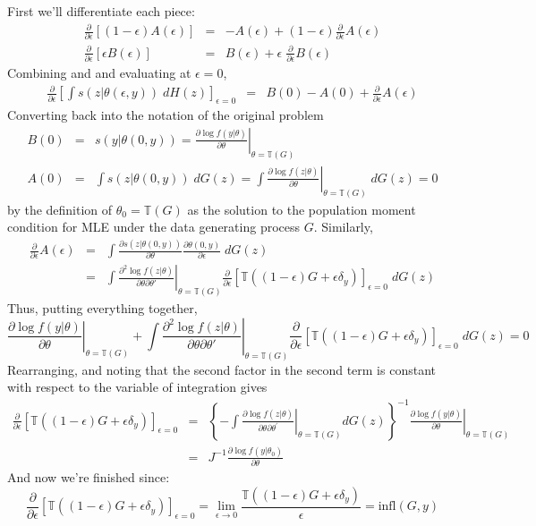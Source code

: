 First we'll differentiate each piece:
	\begin{eqnarray*}
		\frac{\partial}{\partial \epsilon} \left[(1-\epsilon) A(\epsilon)\right] &=& -A(\epsilon) + (1-\epsilon) \frac{\partial}{\partial \epsilon} A(\epsilon)\\
		\frac{\partial}{\partial \epsilon}\left[ \epsilon B(\epsilon)\right] &=& B(\epsilon) +\epsilon\; \frac{\partial}{\partial \epsilon} B(\epsilon)
	\end{eqnarray*}
Combining and and evaluating at $\epsilon = 0$, 
	\begin{eqnarray*}
		\frac{\partial}{\partial \epsilon}\left[\int s(z|\theta(\epsilon,y))\; dH(z) \right]_{\epsilon = 0} &=& B(0) - A(0)  + \frac{\partial}{\partial \epsilon} A(\epsilon)
	\end{eqnarray*}
Converting back into the notation of the original problem
	\begin{eqnarray*}
		B(0) &=& s(y|\theta(0,y))= \left.\frac{\partial \log f(y|\theta)}{\partial \theta}\right|_{\theta = \mathbb{T}(G)}\\
		A(0) &=& \int s(z|\theta(0,y)) \; dG(z) = \int \left.\frac{\partial \log f(z|\theta)}{\partial \theta}\right|_{\theta = \mathbb{T}(G)} \;dG(z) = 0
	\end{eqnarray*}
by the definition of $\theta_0 = \mathbb{T}(G)$ as the solution to the population moment condition for MLE under the data generating process $G$. Similarly,
	\begin{eqnarray*}
		\frac{\partial}{\partial \epsilon} A(\epsilon) &=& \int \frac{\partial s(z|\theta(0,y))}{\partial \theta} \frac{\partial \theta(0,y)}{\partial \epsilon}\; dG(z)\\
		&=& \int \left.\frac{\partial^2 \log f(z|\theta)}{\partial \theta \partial \theta'}\right|_{\theta = \mathbb{T}(G)} \frac{\partial}{\partial \epsilon} \left[  \mathbb{T}(\left(1-\epsilon\right)G+\epsilon\delta_{y})\right]_{\epsilon = 0}\; dG(z)
	\end{eqnarray*}
Thus, putting everything together,
	$$\left.\frac{\partial \log f(y|\theta)}{\partial \theta}\right|_{\theta = \mathbb{T}(G)} + \int \left.\frac{\partial^2 \log f(z|\theta)}{\partial \theta \partial \theta'}\right|_{\theta = \mathbb{T}(G)} \frac{\partial}{\partial \epsilon} \left[  \mathbb{T}(\left(1-\epsilon\right)G+\epsilon\delta_{y})\right]_{\epsilon = 0}\; dG(z) = 0$$
Rearranging, and noting that the second factor in the second term is constant with respect to the variable of integration gives
\begin{eqnarray*}
	\frac{\partial}{\partial\epsilon}\left[\mathbb{T}\left(\left(1-\epsilon\right)G+\epsilon\delta_{y}\right)\right]_{\epsilon = 0}
 & =&\left\{ -\int\left.\frac{\partial\log f\left(z|\theta\right)}{\partial\theta\partial\theta^{\prime}}\right|_{\theta=\mathbb{T}\left(G\right)}dG\left(z\right)\right\} ^{-1}\left.\frac{\partial\log f\left(y|\theta\right)}{\partial\theta}\right|_{\theta=\mathbb{T}\left(G\right)}\\
 & =&J^{-1}\frac{\partial\log f\left(y|\theta_{0}\right)}{\partial\theta}
\end{eqnarray*}
And now we're finished since:
$$\frac{\partial}{\partial\epsilon}\left[\mathbb{T}\left(\left(1-\epsilon\right)G+\epsilon\delta_{y}\right)\right]_{\epsilon = 0} = \lim_{\epsilon \rightarrow 0} \frac{\mathbb{T}\left(\left(1-\epsilon\right)G+\epsilon\delta_{y}\right)}{\epsilon} = \mbox{infl}(G,y)$$

